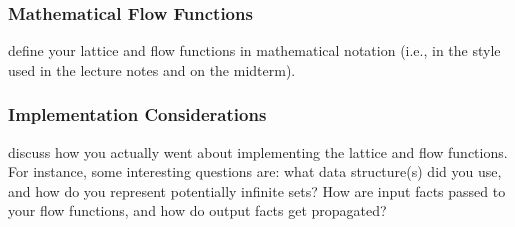 \documentclass{article}
\theoremstyle{definition}
\begin{document}
\subsubsection{Mathematical Flow Functions}

\begin{framed}
  define your lattice and flow functions in mathematical notation
  (i.e., in the style used in the lecture notes and on the midterm).
  
\end{framed}
\subsubsection{Implementation Considerations}
\begin{framed}
  discuss how you actually went about implementing the lattice and
  flow functions. For instance, some interesting questions are: what
  data structure(s) did you use, and how do you represent potentially
  infinite sets? How are input facts passed to your flow functions,
  and how do output facts get propagated?
\end{framed}
\end{document}
